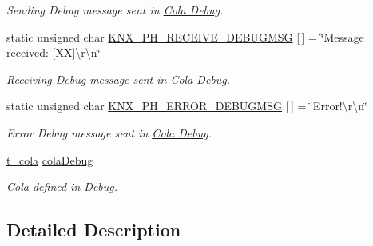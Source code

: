 \begin{DoxyCompactItemize}
\begin{DoxyCompactList}\small\item\em Sending Debug message sent in \hyperlink{group___cola___debug}{Cola Debug}. \end{DoxyCompactList}\item 
static unsigned char \hyperlink{group___k_n_x___p_h___sup___private___variables_ga29eb5f6a2e306cf5545c5a6af4623e35}{K\+N\+X\+\_\+\+P\+H\+\_\+\+R\+E\+C\+E\+I\+V\+E\+\_\+\+D\+E\+B\+U\+G\+M\+SG} \mbox{[}$\,$\mbox{]} = \char`\"{}Message received\+: \mbox{[}XX\mbox{]}\textbackslash{}r\textbackslash{}n\char`\"{}\hypertarget{group___k_n_x___p_h___sup___private___variables_ga29eb5f6a2e306cf5545c5a6af4623e35}{}\label{group___k_n_x___p_h___sup___private___variables_ga29eb5f6a2e306cf5545c5a6af4623e35}

\begin{DoxyCompactList}\small\item\em Receiving Debug message sent in \hyperlink{group___cola___debug}{Cola Debug}. \end{DoxyCompactList}\item 
static unsigned char \hyperlink{group___k_n_x___p_h___sup___private___variables_ga598da98824813e3e2781a39bb3f90bfd}{K\+N\+X\+\_\+\+P\+H\+\_\+\+E\+R\+R\+O\+R\+\_\+\+D\+E\+B\+U\+G\+M\+SG} \mbox{[}$\,$\mbox{]} = \char`\"{}Error!\textbackslash{}r\textbackslash{}n\char`\"{}\hypertarget{group___k_n_x___p_h___sup___private___variables_ga598da98824813e3e2781a39bb3f90bfd}{}\label{group___k_n_x___p_h___sup___private___variables_ga598da98824813e3e2781a39bb3f90bfd}

\begin{DoxyCompactList}\small\item\em Error Debug message sent in \hyperlink{group___cola___debug}{Cola Debug}. \end{DoxyCompactList}\item 
\hyperlink{structt__cola}{t\+\_\+cola} \hyperlink{group___k_n_x___p_h___sup___private___variables_ga314fd637d927bd6a2551e119de623aa5}{cola\+Debug}\hypertarget{group___k_n_x___p_h___sup___private___variables_ga314fd637d927bd6a2551e119de623aa5}{}\label{group___k_n_x___p_h___sup___private___variables_ga314fd637d927bd6a2551e119de623aa5}

\begin{DoxyCompactList}\small\item\em Cola defined in \hyperlink{group___debug}{Debug}. \end{DoxyCompactList}\end{DoxyCompactItemize}


\subsection{Detailed Description}
